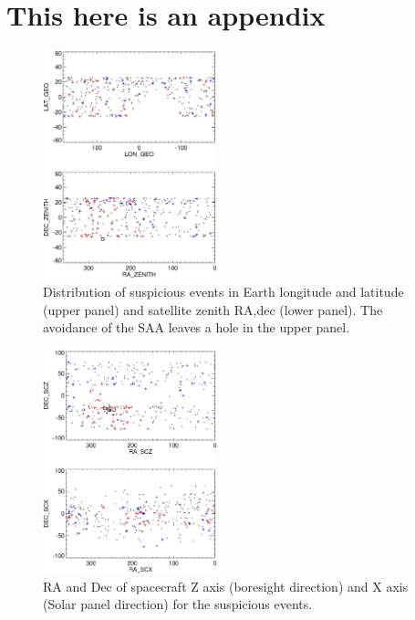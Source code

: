 \documentclass[aps,twocolumn,prd,superscriptaddress,showpacs,nofootinbib,fixfloat]{revtex4}
\begin{document}
\appendix
\section{This here is an appendix}


\begin{figure}
  \centering
  \includegraphics[width=0.45\textwidth]{plots/geo-lonlat.ps}
  \caption{Distribution of suspicious events in Earth
  longitude and latitude (upper panel) and satellite zenith
  RA,dec (lower panel).   The avoidance of the SAA leaves a
  hole in the upper panel.}
  \label{fig:geo-lonlat}
\end{figure}

\begin{figure}
  \centering
  \includegraphics[width=0.45\textwidth]{plots/spacecraft-zx.ps}
  \caption{RA and Dec of spacecraft Z axis (boresight
  direction) and X axis (Solar panel direction) for the
  suspicious events.  }
  \label{fig:spacecraft-zx}
\end{figure}
\end{document}
